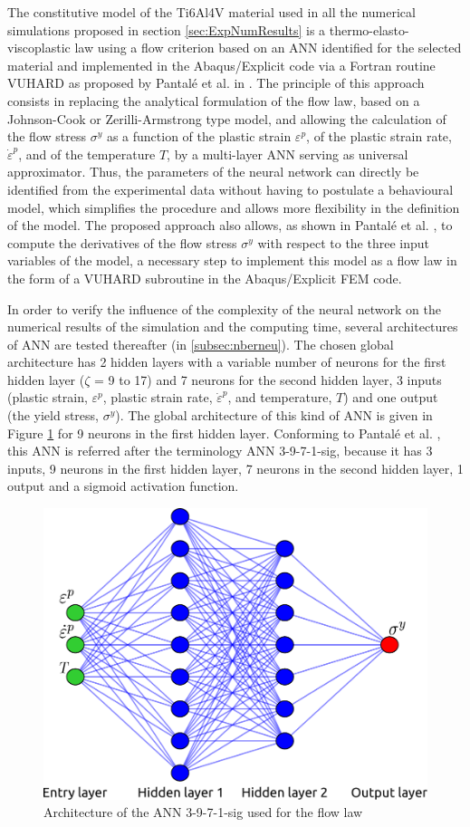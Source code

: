 \documentclass[preprint,12pt,times]{elsarticle}
\begin{document}
The constitutive model of the Ti6Al4V material used in all the numerical simulations proposed in section \ref{sec:ExpNumResults} is a thermo-elasto-viscoplastic law using a flow criterion based on an ANN identified for the selected material and implemented in the Abaqus/Explicit code via a Fortran routine VUHARD as proposed by Pantalé et al. in \cite{pantale_Efficient_2022}.
The principle of this approach consists in replacing the analytical formulation of the flow law, based on a Johnson-Cook or Zerilli-Armstrong type model, and allowing the calculation of the flow stress $\sigma^y$ as a function of the plastic strain $\varepsilon^p$, of the plastic strain rate, ${\dot{\varepsilon}}^p$, and of the temperature $T$, by a multi-layer ANN serving as universal approximator. Thus, the parameters of the neural network can directly be identified from the experimental data without having to postulate a behavioural model, which simplifies the procedure and allows more flexibility in the definition of the model.
The proposed approach also allows, as shown in Pantalé et al. \cite{pantale_Efficient_2022}, to compute the derivatives of the flow stress $\sigma^y$ with respect to the three input variables of the model, a necessary step to implement this model as a flow law in the form of a VUHARD subroutine in the Abaqus/Explicit FEM code.

In order to verify the influence of the complexity of the neural network on the numerical results of the simulation and the computing time, several architectures of ANN are tested thereafter (in \ref{subsec:nberneu}). The chosen global architecture has 2 hidden layers with a variable number of neurons for the first hidden layer ($\zeta$ = 9 to 17) and 7 neurons for the second hidden layer, 3 inputs (plastic strain, $\varepsilon^p$, plastic strain rate, ${\dot{\varepsilon}}^p$, and temperature, $T$) and one output (the yield stress, $\sigma^y$). The global architecture of this kind of ANN is given in Figure \ref{ANN} for 9 neurons in the first hidden layer. Conforming to Pantalé et al. \cite{pantale_Efficient_2022}, this ANN is referred after the terminology ANN 3-9-7-1-sig, because it has 3 inputs, 9 neurons in the first hidden layer, 7 neurons in the second hidden layer, 1 output and a sigmoid activation function.

\begin{figure}[!h]
\centering
\includegraphics[width = 90 mm]{Figures/ANN}
\caption{Architecture of the ANN 3-9-7-1-sig used for the flow law}
\label{ANN}
\end{figure}
\end{document}
